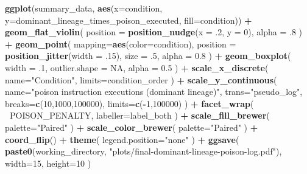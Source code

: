 \documentclass[]{book}
\newenvironment{Shaded}{\begin{snugshade}}{\end{snugshade}}
\newcommand{\DataTypeTok}[1]{\textcolor[rgb]{0.13,0.29,0.53}{#1}}
\newcommand{\DecValTok}[1]{\textcolor[rgb]{0.00,0.00,0.81}{#1}}
\newcommand{\FloatTok}[1]{\textcolor[rgb]{0.00,0.00,0.81}{#1}}
\newcommand{\KeywordTok}[1]{\textcolor[rgb]{0.13,0.29,0.53}{\textbf{#1}}}
\newcommand{\NormalTok}[1]{#1}
\newcommand{\OperatorTok}[1]{\textcolor[rgb]{0.81,0.36,0.00}{\textbf{#1}}}
\newcommand{\OtherTok}[1]{\textcolor[rgb]{0.56,0.35,0.01}{#1}}
\newcommand{\StringTok}[1]{\textcolor[rgb]{0.31,0.60,0.02}{#1}}
\begin{document}
\begin{Shaded}
\begin{Highlighting}[]
\KeywordTok{ggplot}\NormalTok{(summary_data, }\KeywordTok{aes}\NormalTok{(}\DataTypeTok{x=}\NormalTok{condition, }\DataTypeTok{y=}\NormalTok{dominant_lineage_times_poison_executed, }\DataTypeTok{fill=}\NormalTok{condition)) }\OperatorTok{+}
\StringTok{  }\KeywordTok{geom_flat_violin}\NormalTok{(}
    \DataTypeTok{position =} \KeywordTok{position_nudge}\NormalTok{(}\DataTypeTok{x =} \FloatTok{.2}\NormalTok{, }\DataTypeTok{y =} \DecValTok{0}\NormalTok{),}
    \DataTypeTok{alpha =} \FloatTok{.8}
\NormalTok{  ) }\OperatorTok{+}
\StringTok{  }\KeywordTok{geom_point}\NormalTok{(}
    \DataTypeTok{mapping=}\KeywordTok{aes}\NormalTok{(}\DataTypeTok{color=}\NormalTok{condition),}
    \DataTypeTok{position =} \KeywordTok{position_jitter}\NormalTok{(}\DataTypeTok{width =} \FloatTok{.15}\NormalTok{),}
    \DataTypeTok{size =} \FloatTok{.5}\NormalTok{,}
    \DataTypeTok{alpha =} \FloatTok{0.8}
\NormalTok{  ) }\OperatorTok{+}
\StringTok{  }\KeywordTok{geom_boxplot}\NormalTok{(}
    \DataTypeTok{width =} \FloatTok{.1}\NormalTok{,}
    \DataTypeTok{outlier.shape =} \OtherTok{NA}\NormalTok{,}
    \DataTypeTok{alpha =} \FloatTok{0.5}
\NormalTok{  ) }\OperatorTok{+}
\StringTok{  }\KeywordTok{scale_x_discrete}\NormalTok{(}
    \DataTypeTok{name=}\StringTok{"Condition"}\NormalTok{,}
    \DataTypeTok{limits=}\NormalTok{condition_order}
\NormalTok{  ) }\OperatorTok{+}
\StringTok{  }\KeywordTok{scale_y_continuous}\NormalTok{(}
    \DataTypeTok{name=}\StringTok{"poison instruction executions (dominant lineage)"}\NormalTok{,}
    \DataTypeTok{trans=}\StringTok{"pseudo_log"}\NormalTok{,}
    \DataTypeTok{breaks=}\KeywordTok{c}\NormalTok{(}\DecValTok{10}\NormalTok{,}\DecValTok{1000}\NormalTok{,}\DecValTok{100000}\NormalTok{),}
    \DataTypeTok{limits=}\KeywordTok{c}\NormalTok{(}\OperatorTok{-}\DecValTok{1}\NormalTok{,}\DecValTok{100000}\NormalTok{)}
\NormalTok{  ) }\OperatorTok{+}
\StringTok{  }\KeywordTok{facet_wrap}\NormalTok{(}
    \OperatorTok{~}\NormalTok{POISON_PENALTY,}
    \DataTypeTok{labeller=}\NormalTok{label_both}
\NormalTok{  ) }\OperatorTok{+}
\StringTok{  }\KeywordTok{scale_fill_brewer}\NormalTok{(}
    \DataTypeTok{palette=}\StringTok{"Paired"}
\NormalTok{  ) }\OperatorTok{+}
\StringTok{  }\KeywordTok{scale_color_brewer}\NormalTok{(}
    \DataTypeTok{palette=}\StringTok{"Paired"}
\NormalTok{  ) }\OperatorTok{+}
\StringTok{  }\KeywordTok{coord_flip}\NormalTok{() }\OperatorTok{+}
\StringTok{  }\KeywordTok{theme}\NormalTok{(}
    \DataTypeTok{legend.position=}\StringTok{"none"}
\NormalTok{  ) }\OperatorTok{+}
\StringTok{  }\KeywordTok{ggsave}\NormalTok{(}
    \KeywordTok{paste0}\NormalTok{(working_directory, }\StringTok{"plots/final-dominant-lineage-poison-log.pdf"}\NormalTok{),}
    \DataTypeTok{width=}\DecValTok{15}\NormalTok{,}
    \DataTypeTok{height=}\DecValTok{10}
\NormalTok{  )}
\end{Highlighting}
\end{Shaded}
\end{document}

